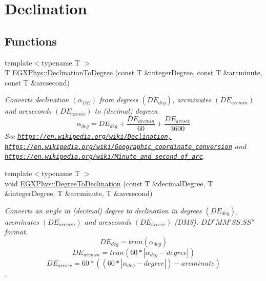 \hypertarget{group___e_g_x_phys-_astrophysics-_declination}{}\section{Declination}
\label{group___e_g_x_phys-_astrophysics-_declination}
\subsection*{Functions}
\begin{DoxyCompactItemize}
\item 
{\footnotesize template$<$typename T $>$ }\\T \mbox{\hyperlink{group___e_g_x_phys-_astrophysics-_declination_ga6d607dacfbbdd0b1e0f18b746cabd712}{E\+G\+X\+Phys\+::\+Declination\+To\+Degree}} (const T \&integer\+Degree, const T \&arcminute, const T \&arcsecond)
\begin{DoxyCompactList}\small\item\em Converts declination $(\alpha_{DE})$ from degrees $(DE_{deg})$, arcminutes $(DE_{arcmin})$ and arcseconds $(DE_{arcsec})$ to (decimal) degrees. \[\alpha_{deg}=DE_{deg} + \frac{DE_{arcmin}}{60} + \frac{DE_{arcsec}}{3600} \] See \href{https://en.wikipedia.org/wiki/Declination,}{\tt https\+://en.\+wikipedia.\+org/wiki/\+Declination,} \href{https://en.wikipedia.org/wiki/Geographic_coordinate_conversion}{\tt https\+://en.\+wikipedia.\+org/wiki/\+Geographic\+\_\+coordinate\+\_\+conversion} and \href{https://en.wikipedia.org/wiki/Minute_and_second_of_arc}{\tt https\+://en.\+wikipedia.\+org/wiki/\+Minute\+\_\+and\+\_\+second\+\_\+of\+\_\+arc}. \end{DoxyCompactList}\item 
{\footnotesize template$<$typename T $>$ }\\void \mbox{\hyperlink{group___e_g_x_phys-_astrophysics-_declination_ga2f4a254231601709112351afad3e504c}{E\+G\+X\+Phys\+::\+Degree\+To\+Declination}} (const T \&decimal\+Degree, T \&integer\+Degree, T \&arcminute, T \&arcsecond)
\begin{DoxyCompactList}\small\item\em Converts an angle in (decimal) degree to declination in degrees $(DE_{deg})$, arcminutes $(DE_{arcmin})$ and arcseconds $(DE_{arcsec})$ (D\+MS). ${DD}^{\circ}{MM}'{SS.SS}''$ format. \[DE_{deg}=trun(\alpha_{deg})\] \[DE_{arcmin}=trun(60 * |\alpha_{deg} - degree|)\] \[DE_{arcsec}=60 * ((60 * |\alpha_{deg} - degree|)-arcminute)\]. \end{DoxyCompactList}\item 

\end{DoxyCompactItemize}
